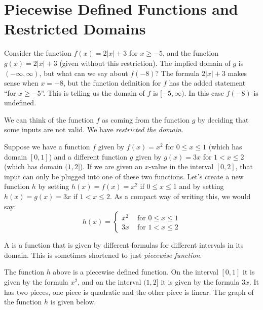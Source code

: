 \documentclass[nooutcomes]{ximera}
\begin{document}
\section{Piecewise Defined Functions and Restricted Domains}
	Consider the function $f(x) = 2|x|+3$ for $x \geq -5$, and the function $g(x) = 2|x|+3$ (given without this restriction).  The implied domain of $g$ is $(-\infty, \infty)$, 
	but what can we say about $f(-8)$? The formula $2|x|+3$ makes sense when $x=-8$, but the function 
	definition for $f$ has the added statement ``for $x \geq -5$''. This is telling us the domain of $f$ is $[-5, \infty)$. In this case $f(-8)$ is undefined. 
	
	We can think of the function $f$ as coming from the function $g$ by deciding that some inputs are not valid. We have \emph{restricted the domain}.
	
	Suppose we have a function $f$ given by $f(x)=x^2$ for $0\leq x \leq 1$ (which has domain $[0,1]$) and a different function $g$ given by
	$g(x) = 3x$ for $1 < x \leq 2$ (which has domain $(1, 2]$). If we are given an $x$-value in the interval $[0,2]$, that input can only be
	plugged into one of these two functions. Let's create a new function $h$ by setting $h(x) = f(x) = x^2$ if $0\leq x \leq 1$ and by setting 
	$h(x) = g(x)=3x$ if $1 < x \leq 2$. As a compact way of writing this, we would say:
	$$ h(x) = \begin{cases} x^2 & \text{ for } 0 \leq x \leq 1 \\ 3x & \text{ for } 1 < x \leq 2\end{cases}$$
	
	\begin{definition}
		A  is a function that is given by different formulas for different intervals in its domain. 
		This is sometimes shortened to just \emph{piecewise function}.
	\end{definition}

	The function $h$ above is a piecewise defined function. On the interval $[0,1]$ it is given by the formula $x^2$, and on the interval $(1,2]$
	it is given by the formula $3x$. It has two pieces, one piece is quadratic and the other piece is linear. The graph of the function $h$ is given below.
\end{document}
